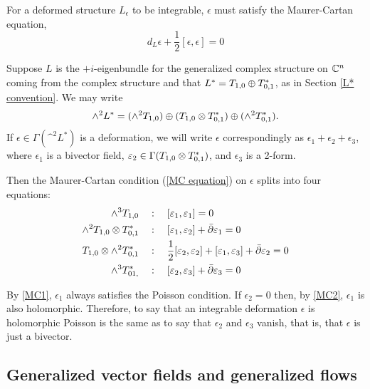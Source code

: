 \documentclass{article}
\begin{document}
For a deformed structure $L_\epsilon$ to be integrable, $\epsilon$ must satisfy the Maurer-Cartan equation,
\begin{equation}\label{MC equation}
d_L \epsilon + \frac{1}{2}[\epsilon,\epsilon] = 0
\end{equation}

\begin{notn}
Suppose $L$ is the $+i$-eigenbundle for the generalized complex structure on $\mathbb C^n$ coming from the complex structure and that $L^* = T_{1,0} \oplus T^*_{0,1}$, as in Section \ref{L* convention}.  We may write
$$\wedge ^2 L^* = (\wedge ^2 T_{1,0}) \oplus (T_{1,0} \otimes T^*_{0,1}) \oplus (\wedge ^2 T^*_{0,1}).$$
If $\epsilon \in \Gamma(\^ ^2 L^*)$ is a deformation, we will write $\epsilon$ correspondingly as $\epsilon_1 + \epsilon_2 + \epsilon_3$, where $\epsilon_1$ is a bivector field, $\varepsilon_2 \in \Gamma(T_{1,0} \otimes T^*_{0,1})$, and $\epsilon_3$ is a 2-form.
\end{notn}

Then the Maurer-Cartan condition (\ref{MC equation}) on $\epsilon$ splits into four equations:
\begin{align}
\^ ^3 T_{1,0}  & \quad:\quad  [\epsilon_1,\epsilon_1] = 0  \label{MC1}\\
\^ ^2 T_{1,0} \tens T^*_{0,1}  & \quad:\quad  [\epsilon_1,\epsilon_2] + \bar\del\epsilon_1 = 0  \label{MC2}\\
T_{1,0} \tens \^ ^2 T^*_{0,1}  & \quad:\quad  \frac{1}{2} [\epsilon_2,\epsilon_2] + [\epsilon_1,\epsilon_3] + \bar\del\epsilon_2 = 0  \label{MC3}\\
\^ ^3 T^*_{01,}  & \quad:\quad  [\epsilon_2,\epsilon_3] + \bar\del\epsilon_3 = 0  \label{MC4} 
\end{align}

\begin{rem}\label{bivector implies holomorphic}
By \eqref{MC1}, $\epsilon_1$ always satisfies the Poisson condition.  If $\epsilon_2=0$ then, by \eqref{MC2}, $\epsilon_1$ is also holomorphic.  Therefore, to say that an integrable deformation $\epsilon$ is holomorphic Poisson is the same as to say that $\epsilon_2$ and $\epsilon_3$ vanish, that is, that $\epsilon$ is just a bivector.
\end{rem}


\subsection{Generalized vector fields and generalized flows}\label{generalized diffeomorphisms}
\end{document}
